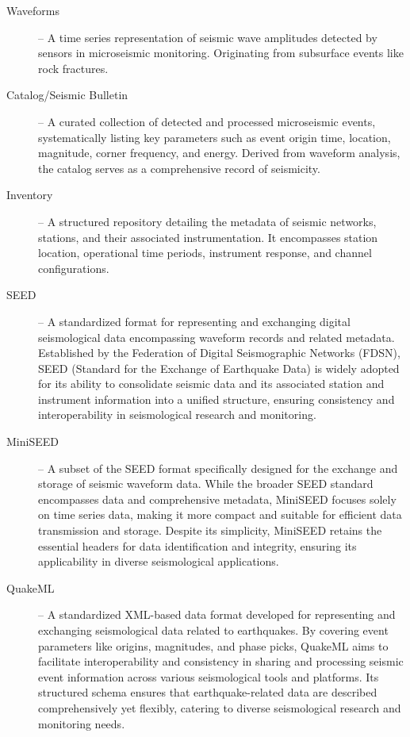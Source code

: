 \begin{description}
    \item[Waveforms] -- A time series representation of seismic wave amplitudes detected by sensors in microseismic monitoring. Originating from subsurface events like rock fractures.
    \item[Catalog/Seismic Bulletin] -- A curated collection of detected and processed microseismic events, systematically listing key parameters such as event origin time, location, magnitude, corner frequency, and energy. Derived from waveform analysis, the catalog serves as a comprehensive record of seismicity.
    \item[Inventory] -- A structured repository detailing the metadata of seismic networks, stations, and their associated instrumentation. It encompasses station location, operational time periods, instrument response, and channel configurations.
    \item[SEED] -- A standardized format for representing and exchanging digital seismological data encompassing waveform records and related metadata. Established by the Federation of Digital Seismographic Networks (FDSN), SEED (Standard for the Exchange of Earthquake Data) is widely adopted for its ability to consolidate seismic data and its associated station and instrument information into a unified structure, ensuring consistency and interoperability in seismological research and monitoring.
    \item[MiniSEED] -- A subset of the SEED format specifically designed for the exchange and storage of seismic waveform data. While the broader SEED standard encompasses data and comprehensive metadata, MiniSEED focuses solely on time series data, making it more compact and suitable for efficient data transmission and storage. Despite its simplicity, MiniSEED retains the essential headers for data identification and integrity, ensuring its applicability in diverse seismological applications.
    \item[QuakeML \citep{quakeml}] -- A standardized XML-based data format developed for representing and exchanging seismological data related to earthquakes. By covering event parameters like origins, magnitudes, and phase picks, QuakeML aims to facilitate interoperability and consistency in sharing and processing seismic event information across various seismological tools and platforms. Its structured schema ensures that earthquake-related data are described comprehensively yet flexibly, catering to diverse seismological research and monitoring needs.

\end{description}
